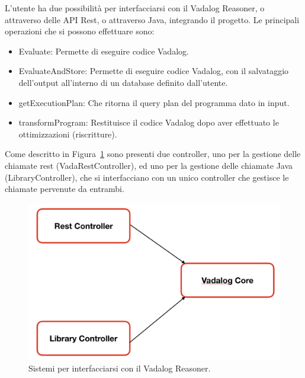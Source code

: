 L'utente ha due possibilità per interfacciarsi con il Vadalog Reasoner, o attraverso delle API Rest, o attraverso Java, integrando il progetto. \newline
Le principali operazioni che si possono effettuare sono: 
\begin{itemize}
	\item Evaluate: Permette di eseguire codice Vadalog.
	\item EvaluateAndStore: Permette di eseguire codice Vadalog, con il salvataggio dell'output all'interno di un database definito dall'utente.
	\item getExecutionPlan: Che ritorna il query plan del programma dato in input.
	\item transformProgram: Restituisce il codice Vadalog dopo aver effettuato le ottimizzazioni (riscritture).
\end{itemize}
Come descritto in Figura~\ref{fig:architettura_2} sono presenti due controller, uno per la gestione delle chiamate rest (VadaRestController), ed uno per la gestione delle chiamate Java (LibraryController), che si interfacciano con un unico controller che gestisce le chiamate pervenute da entrambi. \newline

\begin{figure}[h!]
	\centering
	\includegraphics[width=0.8\linewidth]{figure/architettura-2}
	\caption{Sistemi per interfacciarsi con il Vadalog Reasoner.}
	\label{fig:architettura_2}
\end{figure}

